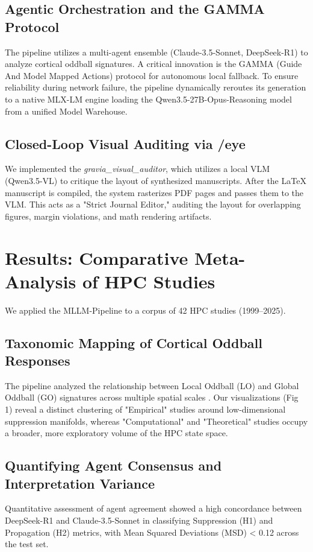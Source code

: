 \documentclass[twocolumn, 10pt]{article}
\begin{document}
\subsection{Agentic Orchestration and the GAMMA Protocol}
The pipeline utilizes a multi-agent ensemble (Claude-3.5-Sonnet, DeepSeek-R1) to analyze cortical oddball signatures. A critical innovation is the GAMMA (Guide And Model Mapped Actions) protocol for autonomous local fallback. To ensure reliability during network failure, the pipeline dynamically reroutes its generation to a native MLX-LM engine loading the Qwen3.5-27B-Opus-Reasoning model from a unified Model Warehouse.

\subsection{Closed-Loop Visual Auditing via /eye}
We implemented the \textit{gravia\_visual\_auditor}, which utilizes a local VLM (Qwen3.5-VL) to critique the layout of synthesized manuscripts. After the LaTeX manuscript is compiled, the system rasterizes PDF pages and passes them to the VLM. This acts as a "Strict Journal Editor," auditing the layout for overlapping figures, margin violations, and math rendering artifacts.

\lipsum[6-12] %

\section{Results: Comparative Meta-Analysis of HPC Studies}
We applied the MLLM-Pipeline to a corpus of 42 HPC studies (1999–2025).

\subsection{Taxonomic Mapping of Cortical Oddball Responses}
The pipeline analyzed the relationship between Local Oddball (LO) and Global Oddball (GO) signatures across multiple spatial scales \cite{Westerberg2022}. Our visualizations (Fig 1) reveal a distinct clustering of "Empirical" studies around low-dimensional suppression manifolds, whereas "Computational" and "Theoretical" studies occupy a broader, more exploratory volume of the HPC state space.

\subsection{Quantifying Agent Consensus and Interpretation Variance}
Quantitative assessment of agent agreement showed a high concordance between DeepSeek-R1 and Claude-3.5-Sonnet in classifying Suppression (H1) and Propagation (H2) metrics, with Mean Squared Deviations (MSD) < 0.12 across the test set.
\end{document}
